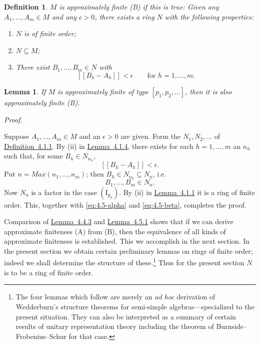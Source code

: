 \documentclass[b5paper,twoside]{article}
\newcommand{\lemref}[2]{\hyperref[#1]{\mbox{Lemma~#2}}}
\newcommand{\defref}[2]{\hyperref[#1]{\mbox{Definition~#2}}}
\theoremstyle{mvnplain}
\newtheorem{lemma}{Lemma}[section]
\newtheorem{definition}{Definition}[section]
\renewenvironment{proof}[1][Proof]{%
  \par\addvspace{0.35\baselineskip}%
  \noindent\textit{#1.}\ \normalfont\ignorespaces
}{%
  \par\addvspace{0.35\baselineskip}%
}
\newcommand{\M}{\mathbf M}
\newcommand{\N}{\mathbf N}
\newcommand{\Metric}[1]{\left[\!\left[#1\right]\!\right]}
\def\M{M}%
\def\N{N}%
\def\Metric#1{[[#1]]}%
\def\operatorname#1{#1}%
\begin{document}
\begin{definition}\label{def:4.5.2}
\(\M\) is approximately finite (B) if this is true: Given any
\(A_1,\ldots,A_m\in\M\) and any \(\epsilon>0\), there exists a ring \(\N\)
with the following properties:
\begin{enumerate}[label=(\roman*)]
\item \(\N\) is of finite order;
\item \(\N\subseteq\M\);
\item There exist \(B_1,\ldots,B_m\in\N\) with
\[
 \Metric{B_h-A_h}<\epsilon\qquad\text{for }h=1,\ldots,m.
\]
\end{enumerate}
\end{definition}

\begin{lemma}\label{lem:4.5.1}
If \(\M\) is approximately finite of type \([p_1,p_2,\ldots]\), then it is
also approximately finite (B).
\end{lemma}

\begin{proof}
Suppose \(A_1,\ldots,A_m\in\M\) and an \(\epsilon>0\) are given. Form the
\(\N_1,\N_2,\ldots\) of \defref{def:4.1.1}{4.1.1}. By (ii) in
\lemref{lem:4.1.4}{4.1.4}, there exists for each \(h=1,\ldots,m\) an
\(n_h\) such that, for some \(B_h\in\N_{n_h}\),
\begin{equation}\tag{4.5.\(\alpha\)}\label{eq:4.5-alpha}
 \Metric{B_h-A_h}<\epsilon.
\end{equation}
Put \(n=\operatorname{Max}(n_1,\ldots,n_m)\); then
\(B_h\in\N_{n_h}\subseteq\N_n\), i.e.
\begin{equation}\tag{4.5.\(\beta\)}\label{eq:4.5-beta}
 B_1,\ldots,B_m\in\N_n.
\end{equation}
Now \(\N_n\) is a factor in the case \((\mathrm I_{p_n})\). By (ii) in
\lemref{lem:4.1.1}{4.1.1} it is a ring of finite order. This, together with
\eqref{eq:4.5-alpha} and \eqref{eq:4.5-beta}, completes the proof.
\end{proof}

Comparison of \lemref{lem:4.4.3}{4.4.3} and \lemref{lem:4.5.1}{4.5.1}
shows that if we can derive approximate finiteness (A) from (B), then the
equivalence of all kinds of approximate finiteness is established. This we
accomplish in the next section. In the present section we obtain certain
preliminary lemmas on rings of finite order; indeed we shall determine the
structure of these.\footnote{The four lemmas which follow are merely an
\emph{ad hoc} derivation of Wedderburn's structure theorems for semi-simple
algebras---specialized to the present situation. They can also be interpreted as
a summary of certain results of unitary representation theory including the
theorem of Burnside--Frobenius--Schur for that case.} Thus for the present
section \(\N\) is to be a ring of finite order.
\end{document}
